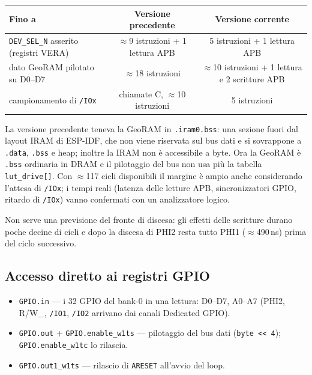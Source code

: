 \documentclass[12pt, a4paper]{article}
\begin{document}
\begin{center}
\begin{tabular}{lcc}
\toprule
\textbf{Fino a} & \textbf{Versione precedente} & \textbf{Versione corrente} \\
\midrule
\texttt{DEV\_SEL\_N} asserito (registri VERA) & $\approx$9 istruzioni + 1 lettura APB & 5 istruzioni + 1 lettura APB \\
dato GeoRAM pilotato su D0--D7 & $\approx$18 istruzioni & $\approx$10 istruzioni + 1 lettura e 2 scritture APB \\
campionamento di \texttt{/IOx} & chiamate C, $\approx$10 istruzioni & 5 istruzioni \\
\bottomrule
\end{tabular}
\end{center}

La versione precedente teneva la GeoRAM in \texttt{.iram0.bss}: una sezione fuori dal layout IRAM di ESP-IDF, che non viene riservata sul bus dati e si sovrappone a \texttt{.data}, \texttt{.bss} e heap; inoltre la IRAM non è accessibile a byte. Ora la GeoRAM è \texttt{.bss} ordinaria in DRAM e il pilotaggio del bus non usa più la tabella \texttt{lut\_drive[]}. Con $\approx$117 cicli disponibili il margine è ampio anche considerando l'attesa di \texttt{/IOx}; i tempi reali (latenza delle letture APB, sincronizzatori GPIO, ritardo di \texttt{/IOx}) vanno confermati con un analizzatore logico.

Non serve una previsione del fronte di discesa: gli effetti delle scritture durano poche decine di cicli e dopo la discesa di PHI2 resta tutto PHI1 ($\approx$490\,ns) prima del ciclo successivo.

\subsection{Accesso diretto ai registri GPIO}
\begin{itemize}
    \item \texttt{GPIO.in} --- i 32 GPIO del bank-0 in una lettura: D0--D7, A0--A7 (PHI2, R/W\_, \texttt{/IO1}, \texttt{/IO2} arrivano dai canali Dedicated GPIO).
    \item \texttt{GPIO.out} + \texttt{GPIO.enable\_w1ts} --- pilotaggio del bus dati (\texttt{byte << 4}); \texttt{GPIO.enable\_w1tc} lo rilascia.
    \item \texttt{GPIO.out1\_w1ts} --- rilascio di \texttt{ARESET} all'avvio del loop.
\end{itemize}
\end{document}
